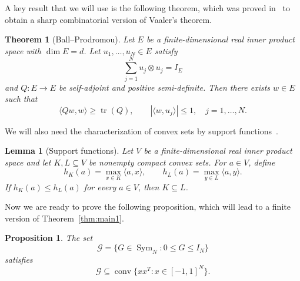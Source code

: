 \documentclass[reqno,a4paper,12pt]{amsart}
\numberwithin{equation}{section}
\newtheorem{theorem}[definition]{Theorem}
\newtheorem{lemma}[definition]{Lemma}
\newtheorem{proposition}[definition]{Proposition}
\newcommand\1{\mathds{1}}
\DeclareMathOperator{\tr}{tr}
\begin{document}
A key result that we will use is the following theorem, which was proved in~\cite[Thm.~1.4]{ballProdromou2009} to obtain a sharp combinatorial version of Vaaler’s theorem.
\begin{theorem}[Ball--Prodromou]\label{thm:ball_prodromou}
    Let $E$ be a finite-dimensional real inner product space with $\dim E=d$. Let $u_1,\dots,u_N\in E$ satisfy
    \begin{equation*}
       \sum_{j=1}^N u_j\otimes u_j=I_E 
    \end{equation*}
    and $Q:E\to E$ be self-adjoint and positive semi-definite. Then there exists $w\in E$ such that
    \begin{equation*}
    \langle Qw,w\rangle\ge \tr(Q),
    \qquad
    |\langle w,u_j\rangle|\le 1,\quad j=1,\dots,N.
    \end{equation*}
\end{theorem}
We will also need the characterization of convex sets by support functions~\cite[Cor.~13.1.1]{rockfellar1970}.
\begin{lemma}[Support functions]\label{lem:support_functions}
Let $V$ be a finite-dimensional real inner product space and let $K,L\subseteq V$ be nonempty compact convex sets. For $a\in V$, define
\begin{equation*}
    h_K(a)=\max_{x\in K}\langle a,x\rangle,
    \qquad
    h_L(a)=\max_{y\in L}\langle a,y\rangle. 
\end{equation*}
If $h_K(a)\le h_L(a)$ for every $a\in V$, then $K\subseteq L$.
\end{lemma}
Now we are ready to prove the following proposition, which will lead to a finite version of Theorem~\ref{thm:main1}.
\begin{proposition}\label{prop:real_convex_hull}
The set
\begin{equation*}
    \mathcal G=\{G\in \operatorname{Sym}_N:0\le G\le I_N\}
\end{equation*}
satisfies
\begin{equation*}
    \mathcal G\subseteq \operatorname{conv}\{xx^T:x\in [-1,1]^N\}.
\end{equation*}
\end{proposition}
\end{document}
